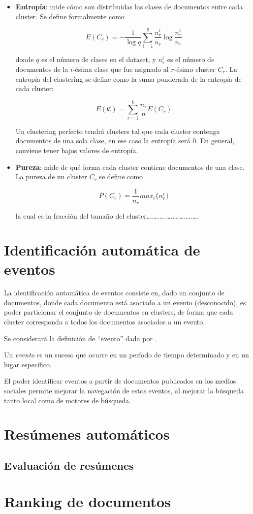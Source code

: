 \begin{itemize}
\item \textbf{Entropía}: mide cómo son distribuidas las clases de documentos
      entre cada cluster. Se define formalmente como

      $$E(C_r) = -\frac{1}{\log q}\sum_{i=1}^q\frac{n^i_r}{n_r}\log\frac{n^i_r}{n_r}$$

      donde $q$ es el número de clases en el dataset, y $n^i_r$ es el
      número de documentos de la $i$-ésima clase que fue asignado al
      $r$-ésimo cluster $C_r$. La entropía del clustering se define
      como la suma ponderada de la entropía de cada cluster:

      $$E(\mathfrak{C}) = \sum_{r=1}^k \frac{n_r}{n} E(C_r)$$

      Un clustering perfecto tendrá clusters tal que cada cluster
      contenga documentos de una sola clase, en ese caso la entropía
      será 0. En general, conviene tener bajos valores de entropía.
\item \textbf{Pureza}: mide de qué forma cada cluster contiene documentos de
      una clase. La pureza de un cluster $C_r$ se define como

      $$P(C_r) = \frac{1}{n_r} max_i\{n^i_r\}$$

      la cual es la fracción del tamaño del cluster\ldots{}.\ldots{}.\ldots{}.\ldots{}.\ldots{}.\ldots{}.\ldots{}.\ldots{}.
\end{itemize}
\section{Identificación automática de eventos}
\label{sec-1.3}


   La identificación automática de eventos consiste en, dado un
   conjunto de documentos, donde cada documento está asociado a un
   evento (desconocido), es poder particionar el conjunto de
   documentos en clusters, de forma que cada cluster corresponda a
   todos los documentos asociados a un evento.

   Se considerará la definición de ``evento'' dada por \cite{Yang:1999:LAD:630307.630471}.

   \begin{defn} Un \emph{evento} es un suceso que ocurre en un período de tiempo
   determinado y en un lugar específico. \end{defn}

   El poder identificar eventos a partir de documentos publicados en
   los medios sociales permite mejorar la navegación de estos eventos,
   al mejorar la búsqueda tanto local como de motores de búsqueda.



\section{Resúmenes automáticos}
\label{sec-1.4}

\subsection{Evaluación de resúmenes}
\label{sec-1.4.1}

\section{Ranking de documentos}
\label{sec-1.5}


